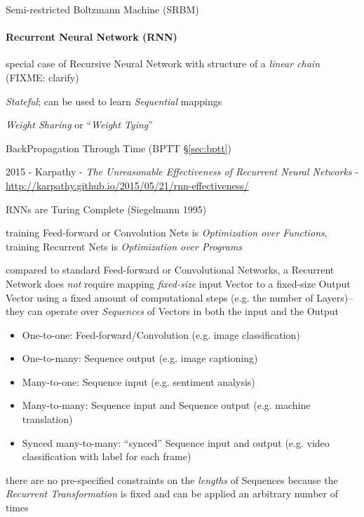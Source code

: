 Semi-restricted Boltzmann Machine (SRBM)



\paragraph{Recurrent Neural Network (RNN)}\label{sec:rnn}\hfill

special case of Recursive Neural Network with structure of a \emph{linear chain}
(FIXME: clarify)

\emph{Stateful}; can be used to learn \emph{Sequential} mappings

\emph{Weight Sharing} or ``\emph{Weight Tying}''

BackPropagation Through Time (BPTT \S\ref{sec:bptt})

\asterism

2015 - Karpathy - \emph{The Unreasonable Effectiveness of Recurrent Neural
  Networks} -
\url{http://karpathy.github.io/2015/05/21/rnn-effectiveness/}

RNNs are Turing Complete (Siegelmann 1995)

training Feed-forward or Convolution Nets is \emph{Optimization over
  Functions}, training Recurrent Nets is \emph{Optimization over Programs}

compared to standard Feed-forward or Convolutional Networks, a Recurrent Network
does \emph{not} require mapping \emph{fixed-size} input Vector to a fixed-size
Output Vector using a fixed amount of computational steps (e.g. the number of
Layers)-- they can operate over \emph{Sequences} of Vectors in both the input
and the Output
\begin{itemize}
  \item One-to-one: Feed-forward/Convolution (e.g. image classification)
  \item One-to-many: Sequence output (e.g. image captioning)
  \item Many-to-one: Sequence input (e.g. sentiment analysis)
  \item Many-to-many: Sequence input and Sequence output (e.g. machine
    translation)
  \item Synced many-to-many: ``synced'' Sequence input and output (e.g. video
    classification with label for each frame)
\end{itemize}
there are no pre-specified constraints on the \emph{lengths} of Sequences
because the \emph{Recurrent Transformation} is fixed and can be applied an
arbitrary number of times

\asterism

